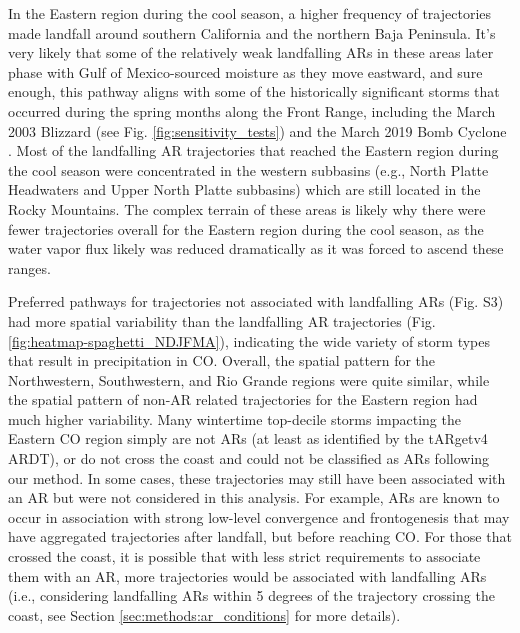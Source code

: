 \documentclass[draft]{agujournal2019}
\begin{document}

In the Eastern region during the cool season, a higher frequency of trajectories made landfall around southern California and the northern Baja Peninsula. It’s very likely that some of the relatively weak landfalling ARs in these areas later phase with Gulf of Mexico-sourced moisture as they move eastward, and sure enough, this pathway aligns with some of the historically significant storms that occurred during the spring months along the Front Range, including the March 2003 Blizzard (see Fig. \ref{fig:sensitivity_tests}) and the March 2019 Bomb Cyclone \cite{Zou2025A2019}. Most of the landfalling AR trajectories that reached the Eastern region during the cool season were concentrated in the western subbasins (e.g., North Platte Headwaters and Upper North Platte subbasins) which are still located in the Rocky Mountains. The complex terrain of these areas is likely why there were fewer trajectories overall for the Eastern region during the cool season, as the water vapor flux likely was reduced dramatically as it was forced to ascend these ranges.  

Preferred pathways for trajectories not associated with landfalling ARs (Fig. S3) had more spatial variability than the landfalling AR trajectories (Fig. \ref{fig:heatmap-spaghetti_NDJFMA}), indicating the wide variety of storm types that result in precipitation in CO. Overall, the spatial pattern for the Northwestern, Southwestern, and Rio Grande regions were quite similar, while the spatial pattern of non-AR related trajectories for the Eastern region had much higher variability. Many wintertime top-decile storms impacting the Eastern CO region simply are not ARs (at least as identified by the tARgetv4 ARDT), or do not cross the coast and could not be classified as ARs following our method. In some cases, these trajectories may still have been associated with an AR but were not considered in this analysis. For example, ARs are known to occur in association with strong low-level convergence and frontogenesis \cite{Cordeira2013} that may have aggregated trajectories after landfall, but before reaching CO. For those that crossed the coast, it is possible that with less strict requirements to associate them with an AR, more trajectories would be associated with landfalling ARs (i.e., considering landfalling ARs within 5 degrees of the trajectory crossing the coast, see Section \ref{sec:methods:ar_conditions} for more details).
\end{document}
